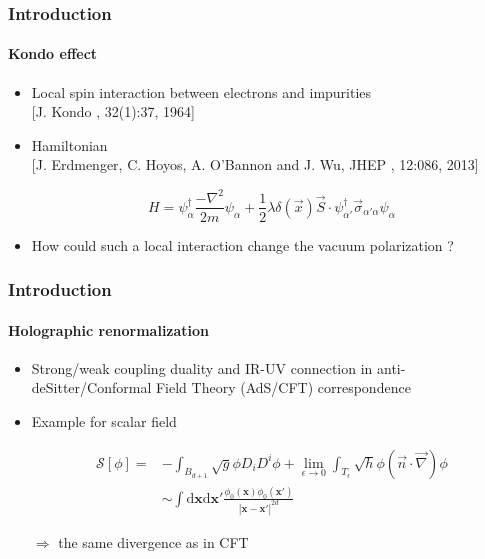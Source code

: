 \documentclass[french]{beamer}
\newcommand{\dd}[0]{\textrm{d}}
\begin{document}
\begin{frame}
\frametitle{Introduction}
\framesubtitle{Kondo effect}
\begin{itemize}
\item Local spin interaction between electrons and impurities
\\
\color{blue}[J. Kondo
, 32(1):37, 1964]\color{black}

\item Hamiltonian
\\
\color{blue}[J. Erdmenger, C. Hoyos, A. O’Bannon and J. Wu, JHEP
, 12:086, 2013]\color{black}


\begin{equation*}
H = \psi_\alpha^\dagger \frac{-\nabla^2}{2m}\psi_\alpha +
\frac 1 2\lambda \delta(\vec{x})\vec{S}\cdot \psi_{\alpha'}^\dagger  \vec{\sigma}_{\alpha' \alpha} \psi_\alpha
\end{equation*}

\item How could such a local interaction change the vacuum polarization ?
\end{itemize}

\end{frame}
\begin{frame}
\frametitle{Introduction}
\framesubtitle{Holographic renormalization}

\begin{itemize}
\item Strong/weak coupling duality and IR-UV connection in anti-deSitter/Conformal Field Theory (AdS/CFT) correspondence

\item Example for scalar field

\begin{equation*}
\begin{split}
\mathcal{S}[\phi] = & -\int_{B_{d+1}} \sqrt{g} \phi D_i D^i \phi + 
\lim_{\epsilon\rightarrow 0}\int_{T_\epsilon}  \sqrt{h} \phi (\vec{n}\cdot\vec{\nabla})\phi \\
%
& \sim \int \dd \mathbf{x} \dd \mathbf{x}' 
\frac{\phi_0(\mathbf{x})\phi_0(\mathbf{x}')}{|\mathbf{x} - \mathbf{x}'|^{2d}}
\end{split}
\end{equation*}

$\Rightarrow$ the same divergence as in CFT

\end{itemize}

\end{frame}
\end{document}
